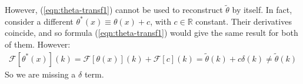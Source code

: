 \documentclass[../template.tex]{subfiles}
\begin{document}
However, (\ref{eqn:theta-transf1}) cannot be used to reconstruct $\tilde{\theta}$ by itself. In fact, consider a different $\theta^*(x) \equiv \theta(x) + c$, with $c \in \mathbb{R}$ constant. Their derivatives coincide, and so formula (\ref{eqn:theta-transf1}) would give the same result for both of them. However:
\begin{align*}
    \mathcal{F}[\theta^*(x)](k) = \mathcal{F}[\theta(x)](k) + \mathcal{F}[c](k) = \tilde{\theta}(k) + c \delta(k) \neq \tilde{\theta}(k)
\end{align*}
So we are missing a $\delta$ term.
\end{document}
